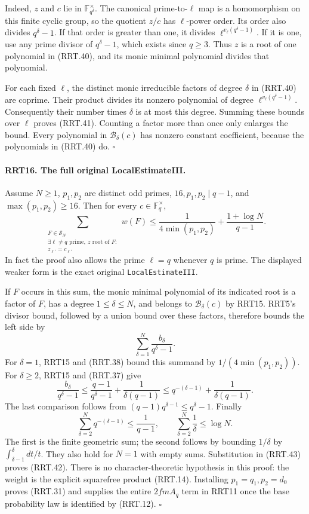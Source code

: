Indeed, $z$ and $c$ lie in $\mathbb F_{q^\delta}^\times$.
The canonical prime-to-$\ell$ map is a homomorphism on this
finite cyclic group, so the quotient $z/c$ has $\ell$-power
order.  Its order also divides $q^\delta-1$.  If that order
is greater than one, it divides
$\ell^{v_\ell(q^\delta-1)}$.  If it is one, use any prime
divisor of $q^\delta-1$, which exists since $q\ge3$.
Thus $z$ is a root of one polynomial in (RRT.40), and its
monic minimal polynomial divides that polynomial.

For each fixed $\ell$, the distinct monic irreducible factors
of degree $\delta$ in (RRT.40) are coprime.  Their product
divides its nonzero polynomial of degree
$\ell^{v_\ell(q^\delta-1)}$.  Consequently their number
times $\delta$ is at most this degree.  Summing these bounds
over $\ell$ proves (RRT.41).  Counting a factor more than
once only enlarges the bound.  Every polynomial in
$\mathcal B_\delta(c)$ has nonzero constant coefficient,
because the polynomials in (RRT.40) do.
\hfill$\square$

\paragraph{RRT16. The full original LocalEstimateIII.}
\label{claim:RRT16}
Assume $N\ge1$, $p_1,p_2$ are distinct odd primes,
$16,p_1,p_2\mid q-1$, and $\max(p_1,p_2)\ge16$.
Then for every $c\in\mathbb F_q^\times$,
\[
 \sum_{\substack{F\in\mathcal S_N\\
        \exists\ell\ne q\text{ prime},\ z\text{ root of }F:\\
                                      z_{\ell'}=c_{\ell'}}}w(F)
        \le\frac1{4\min(p_1,p_2)}+\frac{1+\log N}{q-1}.
 \tag{RRT.42}
\]
In fact the proof also allows the prime $\ell=q$ whenever
$q$ is prime.  The displayed weaker form is the exact
original \texttt{LocalEstimateIII}.

If $F$ occurs in this sum, the monic minimal polynomial of
its indicated root is a factor of $F$, has a degree
$1\le\delta\le N$, and belongs to $\mathcal B_\delta(c)$
by RRT15.  RRT5's divisor bound, followed by a union bound
over these factors, therefore bounds the left side by
\[
                  \sum_{\delta=1}^N
                                \frac{b_\delta}{q^\delta-1}.
 \tag{RRT.43}
\]
For $\delta=1$, RRT15 and (RRT.38) bound this summand by
$1/(4\min(p_1,p_2))$.  For $\delta\ge2$, RRT15 and
(RRT.37) give
\[
 \frac{b_\delta}{q^\delta-1}
       \le\frac{q-1}{q^\delta-1}+\frac1{\delta(q-1)}
       \le q^{-(\delta-1)}+\frac1{\delta(q-1)}.
 \tag{RRT.44}
\]
The last comparison follows from
$(q-1)q^{\delta-1}\le q^\delta-1$.
Finally
\[
 \sum_{\delta=2}^Nq^{-(\delta-1)}\le\frac1{q-1},
 \qquad \sum_{\delta=2}^N\frac1\delta\le\log N.
\]
The first is the finite geometric sum; the second follows
by bounding $1/\delta$ by
$\int_{\delta-1}^{\delta}dt/t$.  They also hold for $N=1$
with empty sums.  Substitution in (RRT.43) proves (RRT.42).
There is no character-theoretic hypothesis in this proof:
the weight is the explicit squarefree product (RRT.14).
Installing $p_1=q_1,p_2=d_0$ proves (RRT.31) and supplies
the entire $2fmA_q$ term in RRT11 once the base probability
law is identified by (RRT.12).
\hfill$\square$

